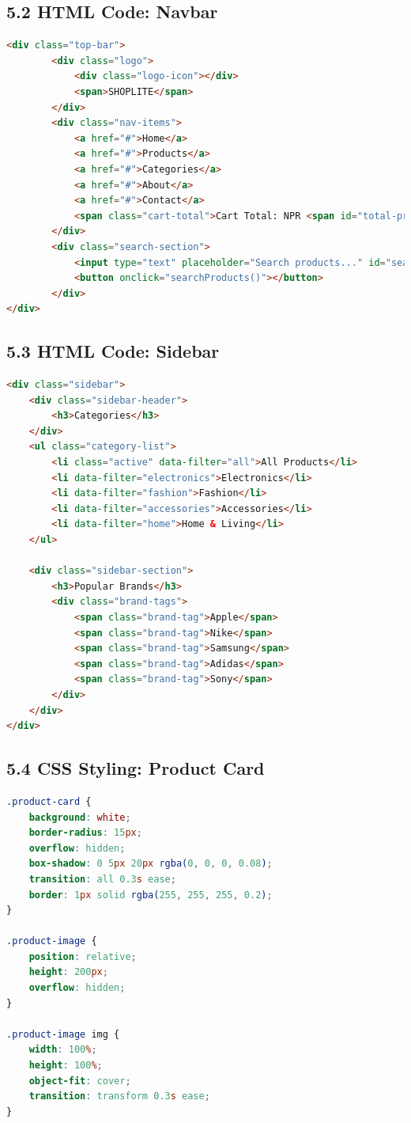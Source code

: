 \documentclass[a4paper,12pt]{article}
\begin{document}
\subsection*{5.2 HTML Code: Navbar }
\begin{lstlisting}[language=HTML]
<div class="top-bar">
        <div class="logo">
            <div class="logo-icon"></div>
            <span>SHOPLITE</span>
        </div>
        <div class="nav-items">
            <a href="#">Home</a>
            <a href="#">Products</a>
            <a href="#">Categories</a>
            <a href="#">About</a>
            <a href="#">Contact</a>
            <span class="cart-total">Cart Total: NPR <span id="total-price">0</span></span>
        </div>
        <div class="search-section">
            <input type="text" placeholder="Search products..." id="searchInput">
            <button onclick="searchProducts()"></button>
        </div>
</div>
\end{lstlisting}

\subsection*{5.3 HTML Code: Sidebar }
\begin{lstlisting}[language=HTML]
<div class="sidebar">
    <div class="sidebar-header">
        <h3>Categories</h3>
    </div>
    <ul class="category-list">
        <li class="active" data-filter="all">All Products</li>
        <li data-filter="electronics">Electronics</li>
        <li data-filter="fashion">Fashion</li>
        <li data-filter="accessories">Accessories</li>
        <li data-filter="home">Home & Living</li>
    </ul>

    <div class="sidebar-section">
        <h3>Popular Brands</h3>
        <div class="brand-tags">
            <span class="brand-tag">Apple</span>
            <span class="brand-tag">Nike</span>
            <span class="brand-tag">Samsung</span>
            <span class="brand-tag">Adidas</span>
            <span class="brand-tag">Sony</span>
        </div>
    </div>
</div>

\end{lstlisting}

\subsection*{5.4 CSS Styling: Product Card}
\begin{lstlisting}[language=CSS]
.product-card {
    background: white;
    border-radius: 15px;
    overflow: hidden;
    box-shadow: 0 5px 20px rgba(0, 0, 0, 0.08);
    transition: all 0.3s ease;
    border: 1px solid rgba(255, 255, 255, 0.2);
}

.product-image {
    position: relative;
    height: 200px;
    overflow: hidden;
}

.product-image img {
    width: 100%;
    height: 100%;
    object-fit: cover;
    transition: transform 0.3s ease;
}
\end{lstlisting}
\end{document}
